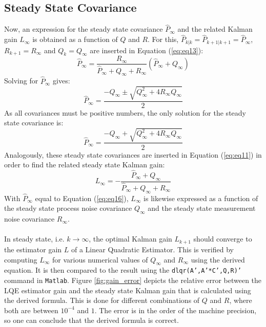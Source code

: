 \documentclass[a4paper,kul]{kulakarticle} %
\begin{document}
\subsection{Steady State Covariance}
\label{subsec:ss}
Now, an expression for the steady state covariance $\hat{P}_\infty$ and the related Kalman gain $L_\infty$ is obtained as a function of $Q$ and $R$. For this, $\hat{P}_{k|k} = \hat{P}_{k+1|k+1} = \hat{P}_\infty$, $R_{k+1} = R_{\infty}$ and $Q_k = Q_\infty$ are inserted in Equation (\ref{eq:eq13}):
\begin{equation}
	\hat{P}_\infty = \frac{R_{\infty}}{\hat{P}_{\infty} + Q_\infty + R_{\infty}}\left(\hat{P}_{\infty} + Q_\infty\right)
\end{equation}
Solving for $\hat{P}_\infty$ gives:
\begin{equation}
	\hat{P}_\infty = \frac{-Q_\infty \pm \sqrt{Q_\infty^2 + 4R_\infty Q_\infty}}{2}
\end{equation}
As all covariances must be positive numbers, the only solution for the steady state covariance is: 
\begin{equation}
\hat{P}_\infty = \frac{-Q_\infty + \sqrt{Q_\infty^2 + 4R_\infty Q_\infty}}{2}
\label{eq:eq16}
\end{equation}
Analogously, these steady state covariances are inserted in Equation (\ref{eq:eq11}) in order to find the related steady state Kalman gain:
\begin{equation}
L_\infty = - \frac{\hat{P}_\infty + Q_\infty}{\hat{P}_\infty + Q_\infty + R_\infty}
\label{eq:eq17}
\end{equation}
With $\hat{P}_\infty$ equal to Equation (\ref{eq:eq16}), $L_\infty$ is likewise expressed as a function of the steady state process noise covariance $Q_\infty$ and the steady state measurement noise covariance $R_\infty$.
\\\\
In steady state, i.e. $k \rightarrow \infty$, the optimal Kalman gain $L_{k+1}$ should converge to the estimator gain $L$ of a Linear Quadratic Estimator. This is verified by computing $L_\infty$ for various numerical values of $Q_\infty$ and $R_\infty$ using the derived equation. It is then compared to the result using the \texttt{dlqr(A',A'*C',Q,R)'} command in \texttt{Matlab}. Figure \ref{fig:gain_error} depicts the relative error between the LQE estimator gain and the steady state Kalman gain that is calculated using the derived formula. This is done for different combinations of $Q$ and $R$, where both are between $10^{-4}$ and $1$. The error is in the order of the machine precision, so one can conclude that the derived formula is correct.
\end{document}
